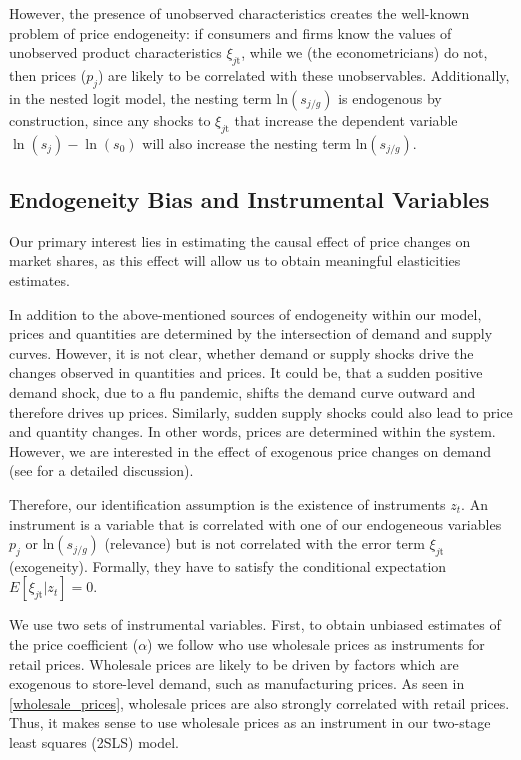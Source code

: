 \documentclass[12pt, authoryear]{elsarticle}
\begin{document}
However, the presence of unobserved characteristics creates the well-known problem of price endogeneity: if consumers and firms know the values of unobserved product characteristics  $\xi _ { j \mathrm { t } }$, while we (the econometricians) do not, then prices ($p_j$) are likely to be correlated with these unobservables. Additionally, in the nested logit model, the  nesting term ln$\left( s _ { j / g  } \right)$ is endogenous by construction, since any shocks to $\xi _ { j \mathrm { t } }$ that increase the dependent variable $\ln \left( s _ { j } \right) - \ln \left( s _ { 0 } \right)$  will also increase the nesting term ln$\left( s _ { j / g  } \right)$.

\subsection{Endogeneity Bias and Instrumental Variables}

Our primary interest lies in estimating the causal effect of price changes on market shares, as this effect will allow us to obtain meaningful elasticities estimates. 

In addition to the above-mentioned sources of endogeneity within our model, prices and quantities are determined by the intersection of demand and supply curves. However, it is not clear, whether demand or supply shocks drive the changes observed in quantities and prices. It could be, that a sudden positive demand shock, due to a flu pandemic, shifts the demand curve outward and therefore drives up prices. Similarly, sudden supply shocks could also lead to price and quantity changes. In other words, prices are determined within the system. However, we are interested in the effect of exogenous price changes on demand (see \cite{angrist2008mostly} for a detailed discussion).

Therefore, our identification assumption is the existence of instruments $z_t$.  An instrument is a variable that is correlated with one of our endogeneous variables $p_{ j }$ or  ln$\left( s _ { j / g  } \right)$ (relevance) but is not correlated with the error term $\xi _ { j \mathrm { t } }$  (exogeneity). Formally, they have to satisfy the conditional  expectation $E[\xi _ { j \mathrm { t } } \lvert z_t ] = 0$.

We use two sets of instrumental variables. First, to obtain unbiased estimates of the price coefficient ($\alpha$) we follow \cite{chintagunta_balancing_2003} who use wholesale prices as instruments for retail prices. Wholesale prices are likely to be driven by factors which are exogenous to store-level demand, such as manufacturing prices. As seen in \ref{wholesale_prices}, wholesale prices are also strongly correlated with retail prices. Thus, it makes sense to use wholesale prices as an instrument in our two-stage least squares (2SLS) model. 
\end{document}
